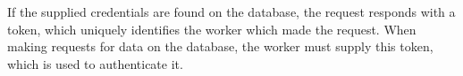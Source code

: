 If the supplied credentials are found on the database, the request responds with
a token, which uniquely identifies the worker which made the request. When
making requests for data on the database, the worker must supply this token,
which is used to authenticate it.\nl



















